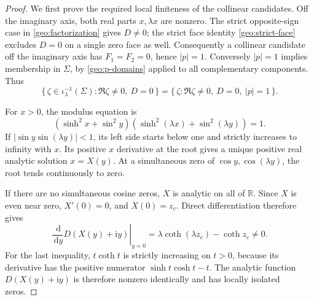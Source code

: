 \documentclass[11pt]{article}
\numberwithin{equation}{section}
\theoremstyle{definition}
\newcommand{\R}{\mathbb R}
\newcommand{\ii}{\mathrm i}
\newcommand{\dd}{\,\mathrm d}
\begin{document}
\begin{proof}
We first prove the required local finiteness of the
collinear candidates.  Off the imaginary axis, both
real parts \(x,\lambda x\) are nonzero.  The strict
opposite-sign case in \eqref{geo:factorization} gives
\(D\ne0\); the strict face identity
\eqref{geo:strict-face} excludes \(D=0\) on a single
zero face as well.  Consequently a collinear candidate
off the imaginary axis has \(F_1=F_2=0\), hence
\(|p|=1\).  Conversely \(|p|=1\) implies membership
in \(\Sigma\), by \eqref{geo:p-domains} applied to all
complementary components.  Thus
\begin{equation}\label{geo:collinear-equality}
 \{\,\zeta\in\iota_\lambda^{-1}(\Sigma):
                       \Re\zeta\ne0,\ D=0\,\}
 =
 \{\,\zeta:\Re\zeta\ne0,\ D=0,\ |p|=1\,\}.
\end{equation}

For \(x>0\), the modulus equation is
\begin{equation}\label{geo:modulus-graph}
 (\sinh^2x+\sin^2y)
       (\sinh^2(\lambda x)+\sin^2(\lambda y))=1.
\end{equation}
If \(|\sin y\sin(\lambda y)|<1\), its left side starts
below one and strictly increases to infinity with \(x\).
Its positive \(x\) derivative at the root gives a unique
positive real analytic solution \(x=X(y)\).
At a simultaneous zero of \(\cos y,\cos(\lambda y)\),
the root tends continuously to zero.

If there are no simultaneous cosine zeros, \(X\) is
analytic on all of \(\R\).  Since \(X\) is even near
zero, \(X'(0)=0\), and \(X(0)=z_c\).
Direct differentiation therefore gives
\begin{equation}\label{geo:collinear-derivative}
 \left.\frac{\dd}{\dd y}D(X(y)+\ii y)\right|_{y=0}
       =\lambda\coth(\lambda z_c)-\coth z_c\ne0.
\end{equation}
For the last inequality, \(t\coth t\) is strictly
increasing on \(t>0\), because its derivative has the
positive numerator \(\sinh t\cosh t-t\).
The analytic function \(D(X(y)+\ii y)\) is therefore
nonzero identically and has locally isolated zeros.


\end{proof}
\end{document}
